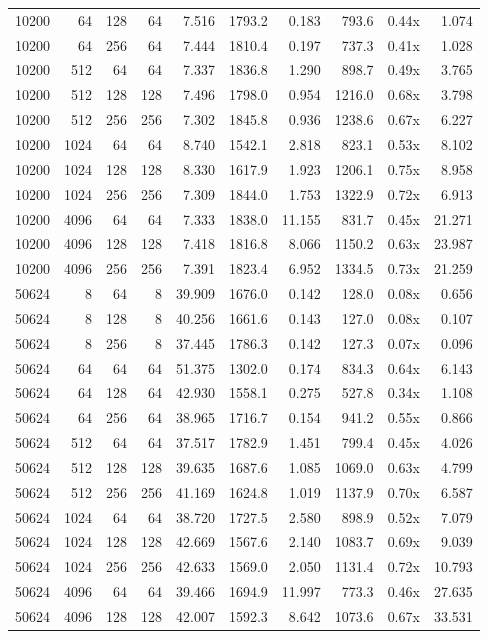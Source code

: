{\begin{longtable}{rrrrrrrrrr}
10200 & 64 & 128 & 64 & 7.516 & 1793.2 & 0.183 & 793.6 & 0.44x & 1.074\\
10200 & 64 & 256 & 64 & 7.444 & 1810.4 & 0.197 & 737.3 & 0.41x & 1.028\\
10200 & 512 & 64 & 64 & 7.337 & 1836.8 & 1.290 & 898.7 & 0.49x & 3.765\\
10200 & 512 & 128 & 128 & 7.496 & 1798.0 & 0.954 & 1216.0 & 0.68x & 3.798\\
10200 & 512 & 256 & 256 & 7.302 & 1845.8 & 0.936 & 1238.6 & 0.67x & 6.227\\
10200 & 1024 & 64 & 64 & 8.740 & 1542.1 & 2.818 & 823.1 & 0.53x & 8.102\\
10200 & 1024 & 128 & 128 & 8.330 & 1617.9 & 1.923 & 1206.1 & 0.75x & 8.958\\
10200 & 1024 & 256 & 256 & 7.309 & 1844.0 & 1.753 & 1322.9 & 0.72x & 6.913\\
10200 & 4096 & 64 & 64 & 7.333 & 1838.0 & 11.155 & 831.7 & 0.45x & 21.271\\
10200 & 4096 & 128 & 128 & 7.418 & 1816.8 & 8.066 & 1150.2 & 0.63x & 23.987\\
10200 & 4096 & 256 & 256 & 7.391 & 1823.4 & 6.952 & 1334.5 & 0.73x & 21.259\\
50624 & 8 & 64 & 8 & 39.909 & 1676.0 & 0.142 & 128.0 & 0.08x & 0.656\\
50624 & 8 & 128 & 8 & 40.256 & 1661.6 & 0.143 & 127.0 & 0.08x & 0.107\\
50624 & 8 & 256 & 8 & 37.445 & 1786.3 & 0.142 & 127.3 & 0.07x & 0.096\\
50624 & 64 & 64 & 64 & 51.375 & 1302.0 & 0.174 & 834.3 & 0.64x & 6.143\\
50624 & 64 & 128 & 64 & 42.930 & 1558.1 & 0.275 & 527.8 & 0.34x & 1.108\\
50624 & 64 & 256 & 64 & 38.965 & 1716.7 & 0.154 & 941.2 & 0.55x & 0.866\\
50624 & 512 & 64 & 64 & 37.517 & 1782.9 & 1.451 & 799.4 & 0.45x & 4.026\\
50624 & 512 & 128 & 128 & 39.635 & 1687.6 & 1.085 & 1069.0 & 0.63x & 4.799\\
50624 & 512 & 256 & 256 & 41.169 & 1624.8 & 1.019 & 1137.9 & 0.70x & 6.587\\
50624 & 1024 & 64 & 64 & 38.720 & 1727.5 & 2.580 & 898.9 & 0.52x & 7.079\\
50624 & 1024 & 128 & 128 & 42.669 & 1567.6 & 2.140 & 1083.7 & 0.69x & 9.039\\
50624 & 1024 & 256 & 256 & 42.633 & 1569.0 & 2.050 & 1131.4 & 0.72x & 10.793\\
50624 & 4096 & 64 & 64 & 39.466 & 1694.9 & 11.997 & 773.3 & 0.46x & 27.635\\
50624 & 4096 & 128 & 128 & 42.007 & 1592.3 & 8.642 & 1073.6 & 0.67x & 33.531\\
\end{longtable}
}
